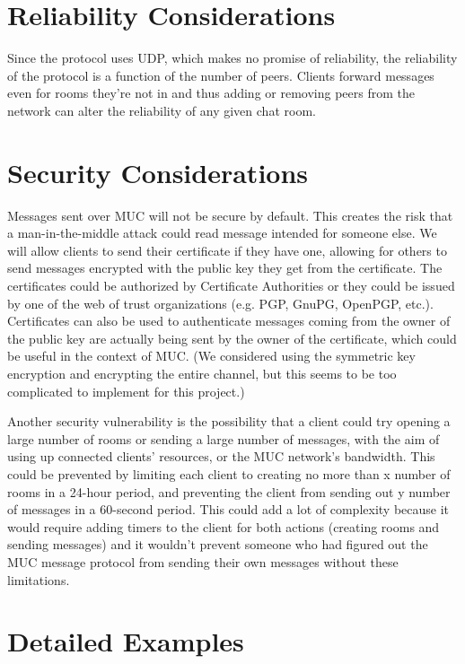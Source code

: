 \documentclass{article}
\begin{document}
\section{Reliability Considerations}

Since the protocol uses UDP, which makes no promise of reliability, the
reliability of the protocol is a function of the number of peers. Clients
forward messages even for rooms they're not in and thus adding or removing peers
from the network can alter the reliability of any given chat room.

\section{Security Considerations}

Messages sent over MUC will not be secure by default. This creates the risk that
a man-in-the-middle attack could read message intended for someone else.  We
will allow clients to send their certificate if they have one, allowing for
others to send messages encrypted with the public key they get from the
certificate. The certificates could be authorized by Certificate Authorities or
they could be issued by one of the web of trust organizations (e.g. PGP, GnuPG,
OpenPGP, etc.). Certificates can also be used to authenticate messages coming
from the owner of the public key are actually being sent by the owner of the
certificate, which could be useful in the context of MUC.  (We considered using
the symmetric key encryption and encrypting the entire channel, but this seems
to be too complicated to implement for this project.)

Another security vulnerability is the possibility that a client could try
opening a large number of rooms or sending a large number of messages, with the
aim of using up connected clients' resources, or the MUC network's bandwidth.
This could be prevented by limiting each client to creating no more than x
number of rooms in a 24-hour period, and preventing the client from sending out
y number of messages in a 60-second period.  This could add a lot of complexity
because it would require adding timers to the client for both actions (creating
rooms and sending messages) and it wouldn't prevent someone who had figured out
the MUC message protocol from sending their own messages without these
limitations.

\section{Detailed Examples}
\end{document}
